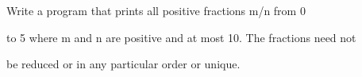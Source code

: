 Write a program that prints all positive fractions m/n from 0

to 5 where m and n are positive and at most 10. The fractions need not

be reduced or in any particular order or unique.

